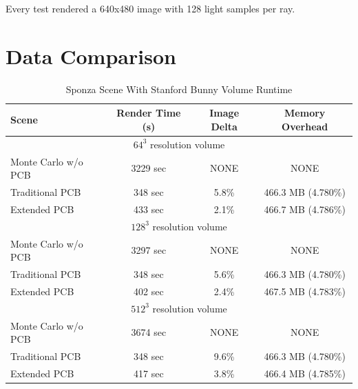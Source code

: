 \documentclass[12pt]{ucthesis}
\begin{document}
Every test rendered a 640x480 image with 128 light samples per ray.

\section{Data Comparison}

\setlength{\tabcolsep}{5pt}

\begin{table}
\begin{center}
\begin{tabular}{ | l | c | c | c | }
  \hline                       
  Scene & Render Time (s) & Image Delta & Memory Overhead \\

  \hline
  \multicolumn{4}{|c|}{$64^3$ resolution volume} \\     
  \hline            

  Monte Carlo w/o PCB & 3229 sec & NONE & NONE \\
  Traditional PCB & 348 sec & 5.8\% & 466.3 MB (4.780\%) \\
  Extended PCB & 433 sec & 2.1\% & 466.7 MB (4.786\%)  \\

  \hline
  \multicolumn{4}{|c|}{$128^3$ resolution volume} \\     
  \hline            
             
  Monte Carlo w/o PCB & 3297 sec & NONE & NONE \\
  Traditional PCB & 348 sec & 5.6\% & 466.3 MB (4.780\%) \\
  Extended PCB & 402 sec & 2.4\% & 467.5 MB (4.783\%)  \\

  \hline
  \multicolumn{4}{|c|}{$512^3$ resolution volume} \\     
  \hline            
             
  Monte Carlo w/o PCB & 3674 sec & NONE & NONE \\
  Traditional PCB & 348 sec & 9.6\% & 466.3 MB (4.780\%) \\
  Extended PCB & 417 sec & 3.8\% & 466.4 MB (4.785\%)  \\
  \hline  

\end{tabular}
\caption{Sponza Scene With Stanford Bunny Volume Runtime}
\label{tb:comparison_bunny}
\end{center}
\end{table}
\end{document}
